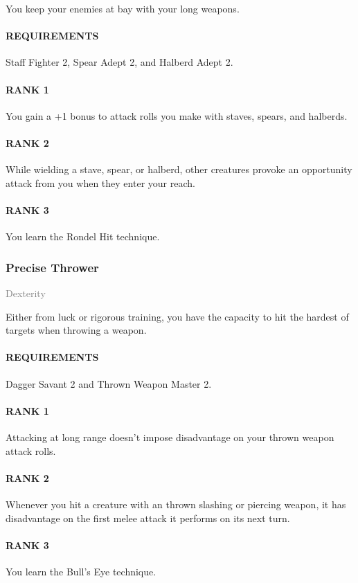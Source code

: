 \normalsize
You keep your enemies at bay with your long weapons.
\paragraph{REQUIREMENTS} Staff Fighter 2, Spear Adept 2, and Halberd Adept 2.
\paragraph{RANK 1} You gain a +1 bonus to attack rolls you make with staves, spears, and halberds.
\paragraph{RANK 2} While wielding a stave, spear, or halberd, other creatures provoke an opportunity attack from you when they enter your reach.
\paragraph{RANK 3} You learn the Rondel Hit technique.

\subsubsection{Precise Thrower} \label{feat::precisethrower}
\small{\textcolor{gray}{Dexterity}}

\normalsize
Either from luck or rigorous training, you have the capacity to hit the hardest of targets when throwing a weapon.
\paragraph{REQUIREMENTS} Dagger Savant 2 and Thrown Weapon Master 2.
\paragraph{RANK 1} Attacking at long range doesn't impose disadvantage on your thrown weapon attack rolls.
\paragraph{RANK 2} Whenever you hit a creature with an thrown slashing or piercing weapon, it has disadvantage on the first melee attack it performs on its next turn.
\paragraph{RANK 3} You learn the Bull's Eye technique.

